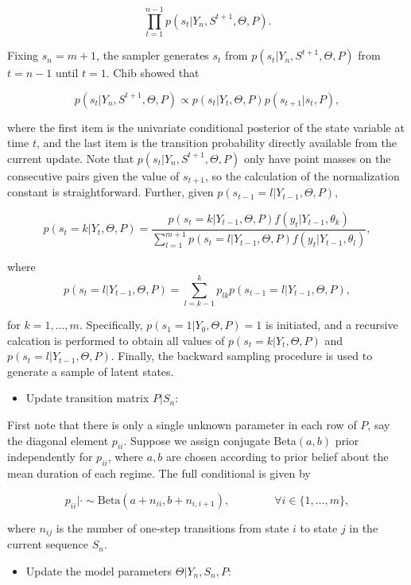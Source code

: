 \documentclass{article}
\begin{document}
\[\prod_{t=1}^{n-1} p(s_t|Y_n,S^{t+1},\Theta,P).\]

Fixing $s_n=m+1$, the sampler generates $s_t$ from
$p(s_t|Y_n,S^{t+1},\Theta,P)$ from $t=n-1$ until $t=1$. Chib showed that

\[p(s_t|Y_n,S^{t+1},\Theta,P)\propto p(s_t|Y_t,\Theta,P)p(s_{t+1}|s_t,P),\]

where the first item is the univariate conditional posterior of the
state variable at time $t$, and the last item is the transition
probability directly available from the current update. Note that
$p(s_t|Y_n,S^{t+1},\Theta,P)$ only have point masses on the consecutive
pairs given the value of $s_{t+1}$, so the calculation of the
normalization constant is straightforward. Further, given
$p(s_{t-1}=l|Y_{t-1},\Theta,P)$,

\[p(s_t=k|Y_t,\Theta,P)=\frac{p(s_t=k|Y_{t-1},\Theta,P)f(y_t|Y_{t-1},\theta_k)}{\sum_{l=1}^{m+1} p(s_t=l|Y_{t-1},\Theta,P)f(y_t|Y_{t-1},\theta_l)},\]

where
\[p(s_t=l|Y_{t-1},\Theta,P)=\sum_{l=k-1}^k p_{lk}p(s_{t-1}=l|Y_{t-1},\Theta,P),\]

for $k=1,\ldots,m$. Specifically, $p(s_1=1|Y_{0},\Theta,P)=1$ is
initiated, and a recursive calcation is performed to obtain all values
of $p(s_t=k|Y_t,\Theta,P)$ and $p(s_t=l|Y_{t-1},\Theta,P)$. Finally, the
backward sampling procedure is used to generate a sample of latent
states.

\begin{itemize}
\itemsep1pt\parskip0pt
\item
  Update transition matrix $P|S_n$:
\end{itemize}

First note that there is only a single unknown parameter in each row of
$P$, say the diagonal element $p_{ii}$. Suppose we assign conjugate
Beta$(a,b)$ prior independently for $p_{ii}$, where $a,b$ are chosen
according to prior belief about the mean duration of each regime. The
full conditional is given by

\[p_{ii}|\cdot \sim \text{Beta}(a+n_{ii},b+n_{i,i+1}),\qquad\qquad\forall i\in \{1,\ldots,m\},\]

where $n_{ij}$ is the number of one-step transitions from state $i$ to
state $j$ in the current sequence $S_n$.

\begin{itemize}
\itemsep1pt\parskip0pt
\item
  Update the model parameters $\Theta|Y_n,S_n,P$:
\end{itemize}
\end{document}
